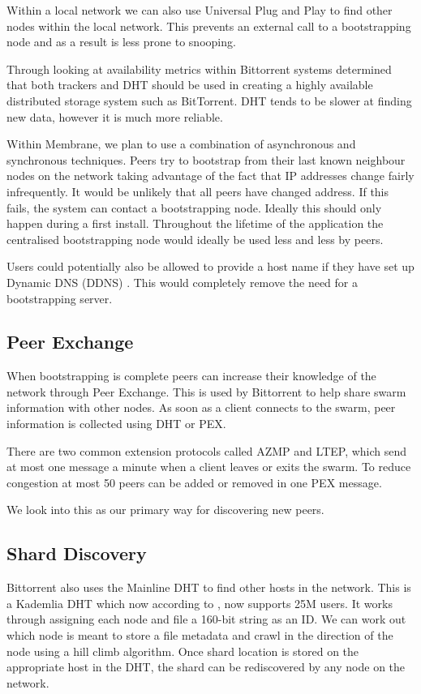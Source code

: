 \documentclass[11pt, a4paper, twocolumn, twoside]{report}
\begin{document}
Within a local network we can also use Universal Plug and Play to find other nodes within the local network. This prevents an external call to a bootstrapping node and as a result is less prone to snooping.

Through looking at availability metrics within Bittorrent systems \cite{neglia2007availability} determined that both trackers and DHT should be used in creating a highly available distributed storage system such as BitTorrent. DHT tends to be slower at finding new data, however it is much more reliable.

Within Membrane, we plan to use a combination of asynchronous and synchronous techniques. Peers try to bootstrap from their last known neighbour nodes on the network taking advantage of the fact that IP addresses change fairly infrequently. It would be unlikely that all peers have changed address. If this fails, the system can contact a bootstrapping node. Ideally this should only happen during a first install. Throughout the lifetime of the application the centralised bootstrapping node would ideally be used less and less by peers.

Users could potentially also be allowed to provide a host name if they have set up Dynamic DNS (DDNS) \citep{bound1997dynamic}. This would completely remove the need for a bootstrapping server.

\subsection{Peer Exchange} \label{sec:pex}

When bootstrapping is complete peers can increase their knowledge of the network through Peer Exchange. This is used by Bittorrent to help share swarm information with other nodes. As soon as a client connects to the swarm, peer information is collected using DHT or PEX.

There are two common extension protocols called AZMP and LTEP, which send at most one message a minute when a client leaves or exits the swarm. To reduce congestion at most 50 peers can be added or removed in one PEX message. \citep{vuze2010vuze}

We look into this as our primary way for discovering new peers.

\subsection{Shard Discovery}

Bittorrent also uses the Mainline DHT to find other hosts in the network. This is a Kademlia DHT which now according to \cite{jones2015mainlinedht}, now supports 25M users. It works through assigning each node and file a 160-bit string as an ID. We can work out which node is meant to store a file metadata and crawl in the direction of the node using a hill climb algorithm. Once shard location is stored on the appropriate host in the DHT, the shard can be rediscovered by any node on the network.
\end{document}
